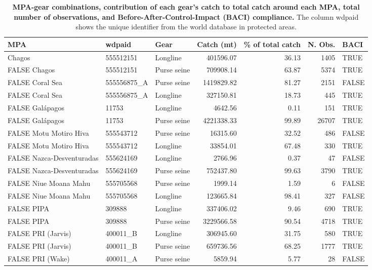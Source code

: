 \begin{table}

\caption{\label{tab:relevant_mpa_gear_combinations}\textbf{MPA-gear combinations, contribution of each gear's catch to total
        catch around each MPA, total number of observations, and Before-After-Control-Impact (BACI) compliance.}
        The column wdpaid shows the unique identifier from the world database in protected areas.}
\centering
\begin{tabular}[t]{lllrrrl}
\toprule
MPA & wdpaid & Gear & Catch (mt) & \% of total catch & N. Obs. & BACI\\
\midrule
Chagos & 555512151 & Longline & 401596.07 & 36.13 & 1405 & TRUE\\
FALSE
Chagos & 555512151 & Purse seine & 709908.14 & 63.87 & 5374 & TRUE\\
FALSE
Coral Sea & 555556875\_A & Purse seine & 1419829.82 & 81.27 & 2151 & FALSE\\
FALSE
Coral Sea & 555556875\_A & Longline & 327150.81 & 18.73 & 445 & TRUE\\
FALSE
Galápagos & 11753 & Longline & 4642.56 & 0.11 & 151 & TRUE\\
FALSE
Galápagos & 11753 & Purse seine & 4221338.33 & 99.89 & 26707 & TRUE\\
FALSE
Motu Motiro Hiva & 555543712 & Purse seine & 16315.60 & 32.52 & 486 & FALSE\\
FALSE
Motu Motiro Hiva & 555543712 & Longline & 33854.01 & 67.48 & 330 & TRUE\\
FALSE
Nazca-Desventuradas & 555624169 & Longline & 2766.96 & 0.37 & 47 & FALSE\\
FALSE
Nazca-Desventuradas & 555624169 & Purse seine & 752437.80 & 99.63 & 3790 & TRUE\\
FALSE
Niue Moana Mahu & 555705568 & Purse seine & 1999.14 & 1.59 & 6 & FALSE\\
FALSE
Niue Moana Mahu & 555705568 & Longline & 123665.84 & 98.41 & 327 & FALSE\\
FALSE
PIPA & 309888 & Longline & 337406.02 & 9.46 & 690 & TRUE\\
FALSE
PIPA & 309888 & Purse seine & 3229566.58 & 90.54 & 4718 & TRUE\\
FALSE
PRI (Jarvis) & 400011\_B & Longline & 306945.60 & 31.75 & 580 & TRUE\\
FALSE
PRI (Jarvis) & 400011\_B & Purse seine & 659736.56 & 68.25 & 1777 & TRUE\\
FALSE
PRI (Wake) & 400011\_A & Purse seine & 5859.94 & 5.77 & 28 & FALSE\\

\end{tabular}
\end{table}
